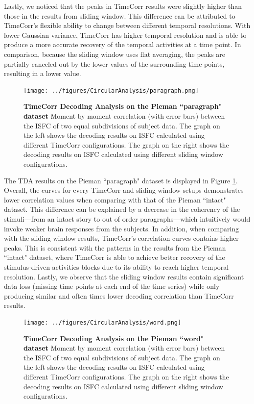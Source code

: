 \documentclass[11pt]{article}
\begin{document}
Lastly, we noticed that the peaks in TimeCorr results were slightly higher than those in the results from sliding window. This difference can be attributed to TimeCorr's flexible ability to change between different temporal resolutions. With lower Gaussian variance, TimeCorr has higher temporal resolution and is able to produce a more accurate recovery of the temporal activities at a time point. In comparison, because the sliding window uses flat averaging, the peaks are partially canceled out by the lower values of the surrounding time points, resulting in a lower value.

\begin{figure}[!htb]
\texttt{[image: ../figures/CircularAnalysis/paragraph.png]}
\caption{\textbf{TimeCorr Decoding Analysis on the Pieman ``paragraph" dataset} Moment by moment correlation (with error bars) between the ISFC of two equal subdivisions of subject data. The graph on the left shows the decoding results on ISFC calculated using different TimeCorr configurations. The graph on the right shows the decoding results on ISFC calculated using different sliding window configurations.}
\label{fig:paragraph}
\end{figure}

The TDA results on the Pieman ``paragraph" dataset is displayed in Figure \ref{fig:paragraph}.
Overall, the curves for every TimeCorr and sliding window setups demonstrates lower correlation values when comparing with that of the Pieman ``intact" dataset. This difference can be explained by a decrease in the coherency of the stimuli---from an intact story to out of order paragraphs---which intuitively would invoke weaker brain responses from the subjects. In addition, when comparing with the sliding window results, TimeCorr's correlation curves contains higher peaks. This is consistent with the patterns in the results from the Pieman ``intact" dataset, where TimeCorr is able to achieve better recovery of the stimulus-driven activities blocks due to its ability to reach higher temporal resolution. Lastly, we observe that the sliding window results contain significant data loss (missing time points at each end of the time series) while only producing similar and often times lower decoding correlation than TimeCorr results.

\begin{figure}[!htb]
\texttt{[image: ../figures/CircularAnalysis/word.png]}
\caption{\textbf{TimeCorr Decoding Analysis on the Pieman ``word" dataset} Moment by moment correlation (with error bars) between the ISFC of two equal subdivisions of subject data. The graph on the left shows the decoding results on ISFC calculated using different TimeCorr configurations. The graph on the right shows the decoding results on ISFC calculated using different sliding window configurations.}
\label{fig:word}
\end{figure}
\end{document}
